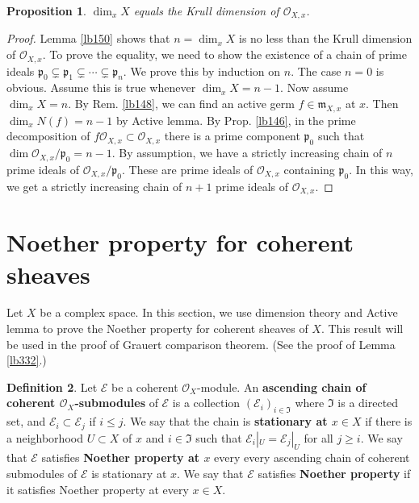 \documentclass[12pt,b5paper,notitlepage]{report}
\theoremstyle{definition}
\newtheorem{df}{Definition}[section]
\theoremstyle{plain}
\newtheorem{pp}[df]{Proposition}
\newcommand{\fk}{\mathfrak}
\newcommand{\scr}{\mathscr}
\newcommand{\pk}{\mathfrak p}
\numberwithin{equation}{section}
\begin{document}
\begin{pp}
$\dim_xX$ equals the Krull dimension of $\scr O_{X,x}$.
\end{pp}


\begin{proof}
Lemma \ref{lb150} shows that $n=\dim_xX$ is no less than the Krull dimension of $\scr O_{X,x}$. To prove the equality, we need to show the existence of a chain of prime ideals $\pk_0\subsetneq\pk_1\subsetneq\cdots\subsetneq \pk_n$. We prove this by induction on $n$. The case $n=0$ is obvious. Assume this is true whenever $\dim_xX=n-1$. Now assume $\dim_xX=n$. By Rem. \ref{lb148}, we can find an active germ $f\in\fk m_{X,x}$ at $x$. Then $\dim_x N(f)=n-1$ by Active lemma. By Prop. \ref{lb146}, in the prime decomposition of $f\scr O_{X,x}\subset\scr O_{X,x}$ there is a prime component $\pk_0$ such that $\dim\scr O_{X,x}/\pk_0=n-1$. By assumption, we have a strictly increasing chain of $n$ prime ideals of  $\scr O_{X,x}/\pk_0$. These are prime ideals of $\scr O_{X,x}$ containing $\pk_0$. In this way, we get a strictly increasing chain of $n+1$ prime ideals of $\scr O_{X,x}$.
\end{proof}



\section{Noether property for coherent sheaves}

Let $X$ be a complex space. In this section, we use dimension theory and Active lemma to prove the Noether property for coherent sheaves of $X$. This result will be used in the proof of Grauert comparison theorem. (See the proof of Lemma \ref{lb332}.)

\begin{df}
Let $\scr E$ be a coherent $\scr O_X$-module. An \textbf{ascending chain of coherent $\scr O_X$-submodules} of $\scr E$ is a collection $(\scr E_i)_{i\in\fk I}$ where $\fk I$ is a directed set, and $\scr E_i\subset\scr E_j$ if $i\leq j$. We say that the chain is \textbf{stationary at $x\in X$} if there is a neighborhood $U\subset X$ of $x$ and $i\in\fk I$ such that $\scr E_i|_U=\scr E_j|_U$ for all $j\geq i$. We say that $\scr E$ satisfies \textbf{Noether property at $x$}  every every ascending chain of coherent submodules of $\scr E$ is stationary at $x$. We say that $\scr E$ satisfies \textbf{Noether property} if it satisfies Noether property at every $x\in X$.
\end{df}
\end{document}
